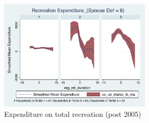 \documentclass[11pt,onecolumn]{article}
\numberwithin{figure}{section}
\begin{document}
\begin{figure}[h]
	\caption{Expenditure on total recreation (post 2005)}
	\centering
	\includegraphics[width=0.65\textwidth]{../ConsumptionPostRetirement_by_SpouseDef_Cats/Smoothed/8/spouse_def_total_recreation_2005_real.pdf}
\end{figure}

\clearpage
\end{document}
